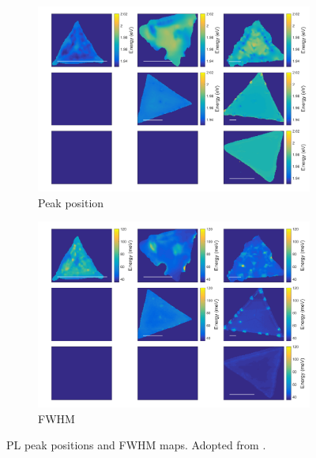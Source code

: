 \begin{figure}[h]
	\begin{center}
		\begin{subfigure}[b]{0.4\textwidth}
			\includegraphics[width=\textwidth]{PaperSIMapsPositionPL.png}
			\caption{Peak position}
			\label{fig:PaperSIMapsPositionPL}
		\end{subfigure}
		\quad
		\begin{subfigure}[b]{0.4\textwidth}
			\includegraphics[width=\textwidth]{PaperSIMapsWidthPL.png}
			\caption{FWHM}
			\label{fig:PaperSIMapsWidthPL}
		\end{subfigure}
		\caption{PL peak positions and FWHM maps. Adopted from \cite{Reale2017}.}
		\label{fig:PaperSIMapsPL}
	\end{center}
\end{figure}

